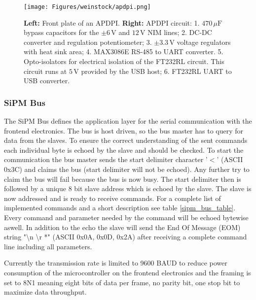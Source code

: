 \documentclass[]{article}
\begin{document}
	\begin{figure}[t]
		\centering
			\texttt{[image: Figures/weinstock/apdpi.png]}
		\caption{\textbf{Left:} Front plate of an APDPI. \textbf{Right:} APDPI circuit: 1. $470\,\mu \text{F}$ bypass capacitors for the $\pm6\,\text{V}$ and $12\,\text{V}$ 
												   NIM lines;
												2. DC-DC converter and regulation potentiometer;
												3. $\pm3.3\,\text{V}$ voltage regulators with heat sink area;
												4. MAX3086E RS-485 to UART converter.
												5. Opto-isolators for electrical isolation of the FT232RL circuit. This circuit runs
												at $5\,\text{V}$ provided by the USB host;
												6. FT232RL UART to USB converter.}
		\label{APDPI_front}
	\end{figure}	

\subsubsection{SiPM Bus}

The SiPM Bus defines the application layer for the serial communication with the frontend electronics. The bus is host driven, so the bus master has to query for data from the slaves.
To ensure the correct understanding of the sent commands each individual byte is echoed by the slave and should be checked. To start the communication the bus master sends the start
delimiter character '$<$' (ASCII 0x3C) and claims the bus (start delimiter will not be echoed). Any further try to claim the bus will fail because the bus is now busy. 
The start delimiter then is followed by a unique 8 bit slave address which is echoed by the slave. The slave is now addressed and is ready to receive commands. For a complete list of
implemented commands and a short description see table \ref{sipm_bus_table}. Every command and parameter needed by the command will be echoed bytewise aswell. In addition to the echo 
the slave will send the End Of Message (EOM) string "\textbackslash n \textbackslash r *" (ASCII 0x0A, 0x0D, 0x2A) after receiving a complete command line including all parameters.

Currently the transmission rate is limited to 9600 BAUD to reduce power consumption of the microcontroller on the frontend electronics and the framing is set to 8N1 meaning eight 
bits of data per frame, no parity bit, one stop bit to maximize data throughput.
\end{document}
